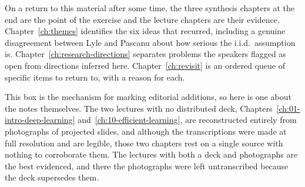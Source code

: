 On a return to this material after some time, the three synthesis chapters at the end are the point
of the exercise and the lecture chapters are their evidence. Chapter~\ref{ch:themes} identifies the
six ideas that recurred, including a genuine disagreement between Lyle and Pascanu about how serious
the i.i.d.\ assumption is. Chapter~\ref{ch:research-directions} separates problems the speakers
flagged as open from directions inferred here. Chapter~\ref{ch:revisit} is an ordered queue of
specific items to return to, with a reason for each.

\begin{aside}
This box is the mechanism for marking editorial additions, so here is one about the notes
themselves. The two lectures with no distributed deck, Chapters~\ref{ch:01-intro-deep-learning}
and~\ref{ch:10-efficient-learning}, are reconstructed entirely from photographs of projected slides,
and although the transcriptions were made at full resolution and are legible, those two chapters
rest on a single source with nothing to corroborate them. The lectures with both a deck and
photographs are the best evidenced, and there the photographs were left untranscribed because the
deck supersedes them.
\end{aside}
